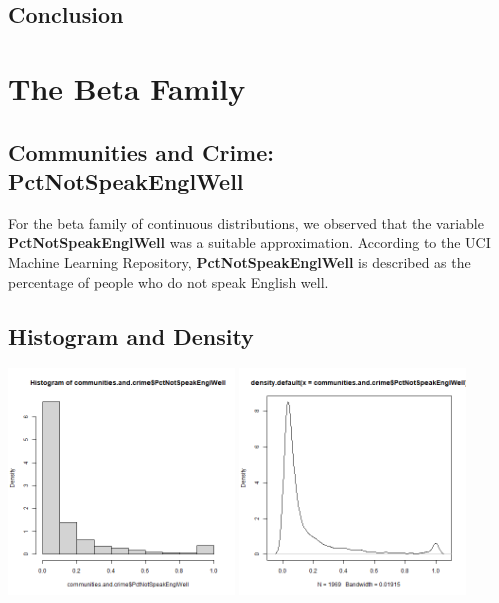\documentclass[12pt, letterpaper]{report}
\begin{document}
\section{Conclusion}


\maketitle
\chapter{The Beta Family}
\section{Communities and Crime: PctNotSpeakEnglWell}

For the beta family of continuous distributions, we observed that the variable \textbf{PctNotSpeakEnglWell} was a suitable approximation. 
According to the UCI Machine Learning Repository, \textbf{PctNotSpeakEnglWell} is described as the percentage of people who do not speak English well. 


\section{Histogram and Density}


\begin{center}
\includegraphics[width=0.45\textwidth]{beta/PctNotSpeakEnglWell_hist}
\includegraphics[width=0.45\textwidth]{beta/PctNotSpeakEnglWell_density}
\end{center}
\end{document}
